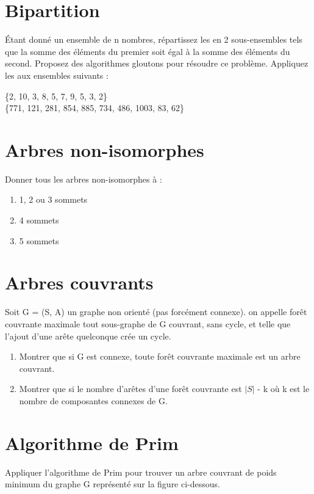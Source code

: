 \documentclass{article}[12pt]
\begin{document}
\section*{Bipartition}
Étant donné un ensemble de n nombres, répartissez les en 2 sous-ensembles tels que la somme des éléments du premier soit égal à la somme des éléments du second. Proposez des algorithmes gloutons pour résoudre ce problème. Appliquez les aux ensembles suivants :
\begin{center}
   \{2, 10, 3, 8, 5, 7, 9, 5, 3, 2\}\\
\{771, 121, 281, 854, 885, 734, 486, 1003, 83, 62\} 
\end{center}

\section*{Arbres non-isomorphes}
Donner tous les arbres non-isomorphes à :
\begin{enumerate}
    \item 1, 2 ou 3 sommets
    \item 4 sommets
    \item 5 sommets
\end{enumerate}

\section*{Arbres couvrants}

Soit G = (S, A) un graphe non orienté (pas forcément connexe). on appelle forêt couvrante maximale tout sous-graphe de G couvrant, sans cycle, et telle que l'ajout d'une arête quelconque crée un cycle.

\begin{enumerate}
    \item Montrer que si G est connexe, toute forêt couvrante maximale est un arbre couvrant.
    \item Montrer que si le nombre d'arêtes d'une forêt couvrante est $|S|$ - k où k est le nombre de composantes connexes de G.
\end{enumerate}

\section*{Algorithme de Prim}

Appliquer l'algorithme de Prim pour trouver un arbre couvrant de poids minimum du graphe G représenté sur la figure ci-dessous.
\end{document}
